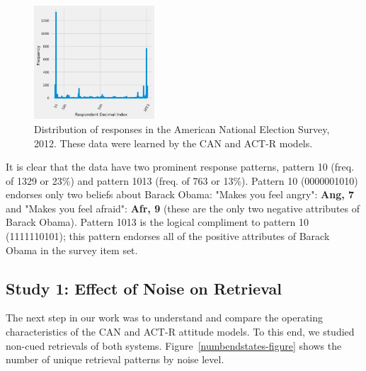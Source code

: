 \documentclass[10pt,letterpaper]{article}
\begin{document}
\begin{figure}[H]
\begin{center}
\includegraphics[width=0.4\textwidth,height=0.3\textwidth]{Fig_Gibbs_RealData.png}
\end{center}
\caption{Distribution of responses in the American National Election Survey, 2012. These data were learned by the CAN and ACT-R models.} 
\label{RealDataGibbs-figure}
\end{figure}

It is clear that the data have two prominent response patterns, pattern 10 (freq. of 1329 or 23\%) and pattern 1013 (freq. of 763 or 13\%).  Pattern 10 (0000001010) endorses only two beliefs about Barack Obama: "Makes you feel angry": \textbf{Ang, 7} and "Makes you feel afraid": \textbf{Afr, 9} (these are the only two negative attributes of Barack Obama). Pattern 1013 is the logical compliment to pattern 10 (1111110101); this pattern endorses all of the positive attributes of Barack Obama in the survey item set. 

\subsection{Study 1: Effect of Noise on Retrieval}
The next step in our work was to understand and compare the operating characteristics of the CAN and ACT-R attitude models.   To this end, we studied non-cued retrievals of both systems. Figure~\ref{numbendstates-figure} shows the number of unique retrieval patterns by noise level.  
\end{document}
